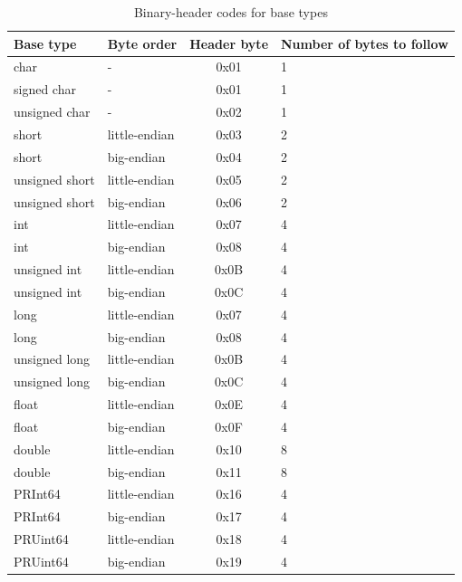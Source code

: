 \documentclass[11pt]{book}
\begin{document}
\begin{table}[h]
\caption{ Binary-header codes for base types }
\label{tab:base-types}
\begin{tabular}{|llcl|} \hline 
Base type      & Byte order    & Header byte & Number of bytes to follow \\ \hline 
char           & -             & 0x01        & 1 \\
signed char    & -             & 0x01        & 1 \\
unsigned char  & -             & 0x02        & 1 \\
short          & little-endian & 0x03        & 2 \\
short          & big-endian    & 0x04        & 2 \\
unsigned short & little-endian & 0x05        & 2 \\
unsigned short & big-endian    & 0x06        & 2 \\
int            & little-endian & 0x07        & 4 \\
int            & big-endian    & 0x08        & 4 \\
unsigned int   & little-endian & 0x0B        & 4 \\
unsigned int   & big-endian    & 0x0C        & 4 \\
long           & little-endian & 0x07        & 4 \\
long           & big-endian    & 0x08        & 4 \\
unsigned long  & little-endian & 0x0B        & 4 \\
unsigned long  & big-endian    & 0x0C        & 4 \\
float          & little-endian & 0x0E        & 4 \\
float          & big-endian    & 0x0F        & 4 \\
double         & little-endian & 0x10        & 8 \\
double         & big-endian    & 0x11        & 8 \\ \hline 
PRInt64        & little-endian & 0x16        & 4 \\
PRInt64        & big-endian    & 0x17        & 4 \\
PRUint64       & little-endian & 0x18        & 4 \\
PRUint64       & big-endian    & 0x19        & 4 \\
\end{tabular}
\begin{center}
\end{center}
\end{table}
\end{document}
